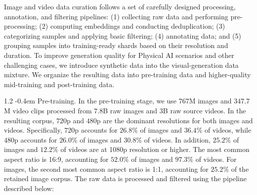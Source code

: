 \documentclass{llmxive}
\makeatletter
\providecommand{\paragraph}{  \@startsection{paragraph}{4}{\z@}    {1\baselineskip \@plus .2\baselineskip}    {-0.4em}    {\normalfont\normalsize\bfseries}}
\makeatother
\begin{document}
Image and video data curation follows a set of carefully designed processing, annotation, and filtering pipelines: (1) collecting raw data and performing pre-processing; (2) computing embeddings and conducting deduplication; (3) categorizing samples and applying basic filtering; (4) annotating data; and (5) grouping samples into training-ready shards based on their resolution and duration. To improve generation quality for Physical AI scenarios and other challenging cases, we introduce synthetic data into the visual-generation data mixture. We organize the resulting data into pre-training data and higher-quality mid-training and post-training data.

\paragraph{Pre-training.}
In the pre-training stage, we use $767$M images and $347.7$M video clips processed from $7.8$B raw images and $3$B raw source videos. In the resulting corpus, $720$p and $480$p are the dominant resolutions for both images and videos. Specifically, $720$p accounts for $26.8\%$ of images and $36.4\%$ of videos, while $480$p accounts for $26.0\%$ of images and $30.8\%$ of videos. In addition, $25.2\%$ of images and $12.2\%$ of videos are at 1080p resolution or higher. The most common aspect ratio is 16:9, accounting for $52.0\%$ of images and $97.3\%$ of videos. For images, the second most common aspect ratio is 1:1, accounting for $25.2\%$ of the retained image corpus. The raw data is processed and filtered using the pipeline described below:
\end{document}

